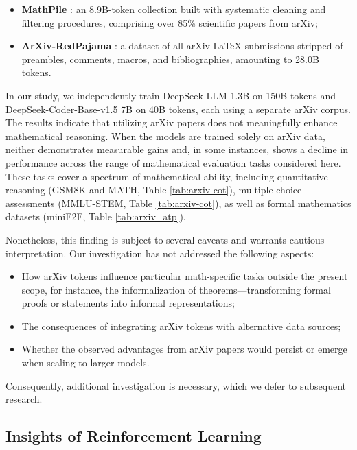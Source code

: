 \begin{itemize}[topsep=0pt]
\begin{itemize}[topsep=0pt]
    \item \textbf{MathPile} \citep{mathpile}: an 8.9B-token collection built with systematic cleaning and filtering procedures, comprising over 85\% scientific papers from arXiv;
    \item \textbf{ArXiv-RedPajama} \citep{redpajama}: a dataset of all arXiv LaTeX submissions stripped of preambles, comments, macros, and bibliographies, amounting to 28.0B tokens.
\end{itemize}

In our study, we independently train DeepSeek-LLM 1.3B on 150B tokens and DeepSeek-Coder-Base-v1.5 7B on 40B tokens, each using a separate arXiv corpus. The results indicate that utilizing arXiv papers does not meaningfully enhance mathematical reasoning. When the models are trained solely on arXiv data, neither demonstrates measurable gains and, in some instances, shows a decline in performance across the range of mathematical evaluation tasks considered here. These tasks cover a spectrum of mathematical ability, including quantitative reasoning (GSM8K and MATH, Table \ref{tab:arxiv-cot}), multiple-choice assessments (MMLU-STEM, Table \ref{tab:arxiv-cot}), as well as formal mathematics datasets (miniF2F, Table \ref{tab:arxiv_atp}).

Nonetheless, this finding is subject to several caveats and warrants cautious interpretation. Our investigation has not addressed the following aspects:

\begin{itemize}[topsep=0pt]
    \item How arXiv tokens influence particular math-specific tasks outside the present scope, for instance, the informalization of theorems—transforming formal proofs or statements into informal representations;
    \item The consequences of integrating arXiv tokens with alternative data sources;
    \item Whether the observed advantages from arXiv papers would persist or emerge when scaling to larger models.
\end{itemize}

Consequently, additional investigation is necessary, which we defer to subsequent research.

\subsection{Insights of Reinforcement Learning}

\end{itemize}
